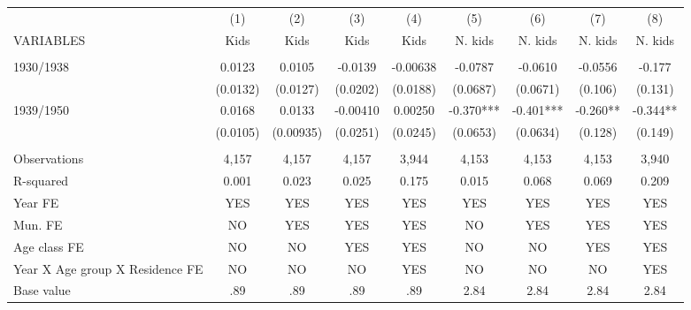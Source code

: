 \begin{tabular}{lcccccccc} \hline
 & (1) & (2) & (3) & (4) & (5) & (6) & (7) & (8) \\
VARIABLES & Kids & Kids & Kids & Kids & N. kids & N. kids & N. kids & N. kids \\ \hline
 &  &  &  &  &  &  &  &  \\
1930/1938 & 0.0123 & 0.0105 & -0.0139 & -0.00638 & -0.0787 & -0.0610 & -0.0556 & -0.177 \\
 & (0.0132) & (0.0127) & (0.0202) & (0.0188) & (0.0687) & (0.0671) & (0.106) & (0.131) \\
1939/1950 & 0.0168 & 0.0133 & -0.00410 & 0.00250 & -0.370*** & -0.401*** & -0.260** & -0.344** \\
 & (0.0105) & (0.00935) & (0.0251) & (0.0245) & (0.0653) & (0.0634) & (0.128) & (0.149) \\
 &  &  &  &  &  &  &  &  \\
Observations & 4,157 & 4,157 & 4,157 & 3,944 & 4,153 & 4,153 & 4,153 & 3,940 \\
R-squared & 0.001 & 0.023 & 0.025 & 0.175 & 0.015 & 0.068 & 0.069 & 0.209 \\
Year FE & YES & YES & YES & YES & YES & YES & YES & YES \\
Mun. FE & NO & YES & YES & YES & NO & YES & YES & YES \\
Age class FE & NO & NO & YES & YES & NO & NO & YES & YES \\
Year X Age group X Residence FE & NO & NO & NO & YES & NO & NO & NO & YES \\
 Base value & .89 & .89 & .89 & .89 & 2.84 & 2.84 & 2.84 & 2.84 \\ \hline
\end{tabular}
